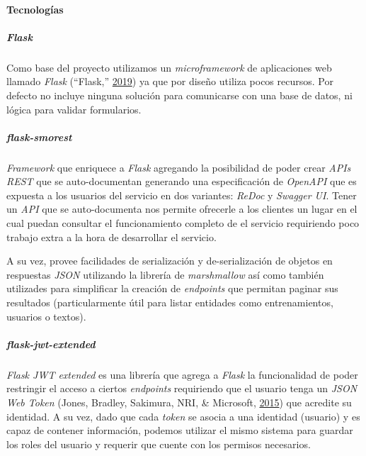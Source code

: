 \documentclass[12pt,a4paper,]{scrartcl}
\let\oldparagraph\paragraph
\renewcommand{\paragraph}[1]{\oldparagraph{#1}\mbox{}}
\let\oldsubparagraph\subparagraph
\renewcommand{\subparagraph}[1]{\oldsubparagraph{#1}\mbox{}}
\begin{document}
\hypertarget{tecnologuxedas-1}{%
\paragraph{Tecnologías}\label{tecnologuxedas-1}}

\hypertarget{flask}{%
\subparagraph{\texorpdfstring{\emph{Flask}}{Flask}}\label{flask}}

Como base del proyecto utilizamos un \emph{microframework} de aplicaciones web llamado \emph{Flask} (``Flask,'' \protect\hyperlink{ref-flask}{2019}) ya que por diseño utiliza pocos recursos. Por defecto no incluye ninguna solución para comunicarse con una base de datos, ni lógica para validar formularios.

\hypertarget{flask-smorest}{%
\subparagraph{\texorpdfstring{\emph{flask-smorest}}{flask-smorest}}\label{flask-smorest}}

\emph{Framework} que enriquece a \emph{Flask} agregando la posibilidad de poder crear \emph{APIs REST} que se auto-documentan generando una especificación de \emph{OpenAPI} que es expuesta a los usuarios del servicio en dos variantes: \emph{ReDoc} y \emph{Swagger UI}. Tener un \emph{API} que se auto-documenta nos permite ofrecerle a los clientes un lugar en el cual puedan consultar el funcionamiento completo de el servicio requiriendo poco trabajo extra a la hora de desarrollar el servicio.

A su vez, provee facilidades de serialización y de-serialización de objetos en respuestas \emph{JSON} utilizando la librería de \emph{marshmallow} así como también utilizades para simplificar la creación de \emph{endpoints} que permitan paginar sus resultados (particularmente útil para listar entidades como entrenamientos, usuarios o textos).

\hypertarget{flask-jwt-extended}{%
\subparagraph{\texorpdfstring{\emph{flask-jwt-extended}}{flask-jwt-extended}}\label{flask-jwt-extended}}

\emph{Flask JWT extended} es una librería que agrega a \emph{Flask} la funcionalidad de poder restringir el acceso a ciertos \emph{endpoints} requiriendo que el usuario tenga un \emph{JSON Web Token} (Jones, Bradley, Sakimura, NRI, \& Microsoft, \protect\hyperlink{ref-JWT}{2015}) que acredite su identidad. A su vez, dado que cada \emph{token} se asocia a una identidad (usuario) y es capaz de contener información, podemos utilizar el mismo sistema para guardar los roles del usuario y requerir que cuente con los permisos necesarios.
\end{document}
